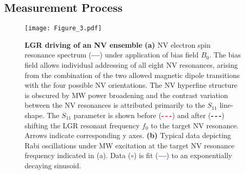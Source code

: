 \subsection{Measurement Process} \label{measurement}

\begin{figure}[t!]
\centering
\texttt{[image: Figure\_3.pdf]}  
\caption{\textbf{LGR driving of an NV ensemble} \textbf{(a)} NV electron spin resonance spectrum (\textcolor{blue}{\textbf{---}}) under application of bias field $B_0$. The bias field allows individual addressing of all eight NV resonances, arising from the combination of the two allowed magnetic dipole transitions with the four possible NV orientations. The NV hyperfine structure is obscured by MW power broadening and the contrast variation between the NV resonances is attributed primarily to the $S_{11}$ line-shape. The $S_{11}$ parameter is shown before (\textcolor{red}{\textbf{-\,-\,-}}) and after (\textcolor{dolla-bill}{\textbf{-\,-\,-}}) shifting the LGR resonant frequency $f_0$ to the target NV resonance. Arrows indicate corresponding y axes. \textbf{(b)} Typical data depicting Rabi oscillations under MW excitation at the target NV resonance frequency indicated in (a). Data (\textcolor{navyblue}{$\mathbf{\circ}$}) is fit (\textcolor{blue}{\textbf{---}}) to an exponentially decaying sinusoid.}
\label{LGR_Rabi_meas}
\end{figure}

